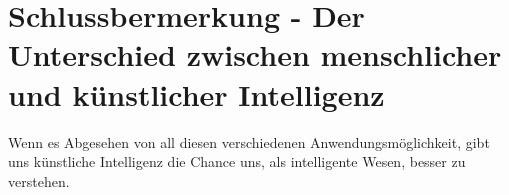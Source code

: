 \documentclass[a4paper,12pt,german,ngerman]{report}
\begin{document}
    \chapter{Schlussbermerkung - Der Unterschied zwischen menschlicher und künstlicher Intelligenz}
    Wenn es
    Abgesehen von all diesen verschiedenen Anwendungsmöglichkeit, gibt uns künstliche Intelligenz die Chance
    uns, als intelligente Wesen, besser zu verstehen.

    \printbibliography[
        title={Quellenverzeichnis},
    ]
\end{document}
